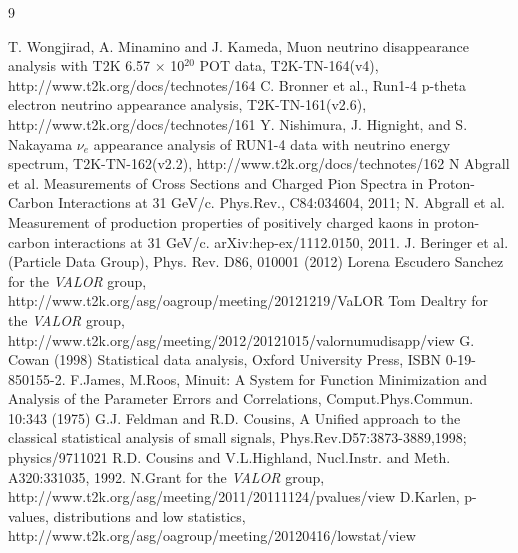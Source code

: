 \begin{thebibliography}{9}
%
% 
%

  T. Wongjirad, A. Minamino and J. Kameda,
  Muon neutrino disappearance analysis with T2K 6.57 $\times$ 10$^{20}$ POT data,
  T2K-TN-164(v4),
  http://www.t2k.org/docs/technotes/164
  C. Bronner et al.,
  Run1-4 p-theta electron neutrino appearance analysis,
  T2K-TN-161(v2.6),
  http://www.t2k.org/docs/technotes/161
  Y. Nishimura, J. Hignight, and S. Nakayama
  $\nu_e$ appearance analysis of RUN1-4 data with neutrino energy spectrum,
  T2K-TN-162(v2.2),
  http://www.t2k.org/docs/technotes/162
%
%
  N Abgrall et al. Measurements of Cross Sections and Charged Pion Spectra in Proton-Carbon Interactions
  at 31 GeV/c. Phys.Rev., C84:034604, 2011;
  N. Abgrall et al. Measurement of production properties of positively charged kaons in proton-carbon
  interactions at 31 GeV/c. arXiv:hep-ex/1112.0150, 2011.
%
%
  J. Beringer et al. (Particle Data Group), Phys. Rev. D86, 010001 (2012)
%
%
  Lorena Escudero Sanchez for the {\em VALOR} group, 
  http://www.t2k.org/asg/oagroup/meeting/20121219/VaLOR%
  Tom Dealtry for the {\em VALOR} group,
  http://www.t2k.org/asg/meeting/2012/20121015/valornumudisapp/view
%
%
  G. Cowan (1998) Statistical data analysis, 
  Oxford University Press, ISBN 0-19-850155-2.
  F.James, M.Roos, Minuit: A System for Function Minimization and Analysis of the 
  Parameter Errors and Correlations, Comput.Phys.Commun. 10:343 (1975)
  G.J. Feldman and R.D. Cousins,
  A Unified approach to the classical statistical analysis of small signals,
  Phys.Rev.D57:3873-3889,1998; physics/9711021
  R.D. Cousins and V.L.Highland, 
  Nucl.Instr. and Meth. A320:331035, 1992.
 N.Grant for the {\em VALOR} group,
 http://www.t2k.org/asg/meeting/2011/20111124/pvalues/view
 D.Karlen,
 p-values, distributions and low statistics,
 http://www.t2k.org/asg/oagroup/meeting/20120416/lowstat/view

\end{thebibliography}
